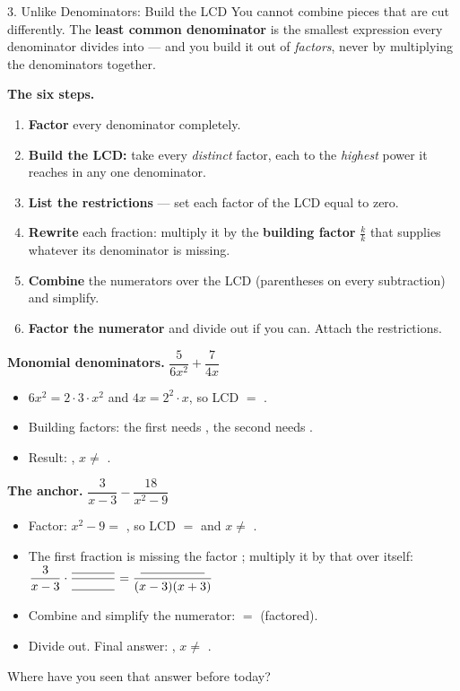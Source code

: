 \documentclass[10pt]{article}
\begin{document}
\begin{notesbox}{3. Unlike Denominators: Build the LCD}
You cannot combine pieces that are cut differently. The \textbf{least common denominator} is the
smallest expression every denominator divides into --- and you build it out of \emph{factors}, never by
multiplying the denominators together.

\vspace{4pt}
\textbf{The six steps.}
\begin{enumerate}[leftmargin=1.9em, itemsep=2pt]
  \item \textbf{Factor} every denominator completely.
  \item \textbf{Build the LCD:} take every \emph{distinct} factor, each to the \emph{highest} power it reaches in any one denominator.
  \item \textbf{List the restrictions} --- set each factor of the LCD equal to zero.
  \item \textbf{Rewrite} each fraction: multiply it by the \textbf{building factor} $\frac{k}{k}$ that supplies whatever its denominator is missing.
  \item \textbf{Combine} the numerators over the LCD (parentheses on every subtraction) and simplify.
  \item \textbf{Factor the numerator} and divide out if you can. Attach the restrictions.
\end{enumerate}

\vspace{4pt}
\textbf{Monomial denominators.} \; $\dfrac{5}{6x^2}+\dfrac{7}{4x}$
\begin{itemize}[leftmargin=1.5em, itemsep=3pt]
  \item $6x^2=2\cdot3\cdot x^2$ and $4x=2^2\cdot x$, so LCD $=$ \blank{1.6cm}.
  \item Building factors: the first needs \blank{1.0cm}, the second needs \blank{1.2cm}.
  \item Result: \blank{2.6cm}, \; $x\neq$ \blank{1.0cm}.
\end{itemize}

\vspace{5pt}
\textbf{The anchor.} \; $\dfrac{3}{x-3}-\dfrac{18}{x^2-9}$
\begin{itemize}[leftmargin=1.5em, itemsep=3pt]
  \item Factor: $x^2-9=$ \blank{2.4cm}, so LCD $=$ \blank{2.8cm} and $x\neq$ \blank{1.8cm}.
  \item The first fraction is missing the factor \blank{1.4cm}; multiply it by that over itself:
        $\dfrac{3}{x-3}\cdot\dfrac{\rule{1.2cm}{0.4pt}}{\rule{1.2cm}{0.4pt}}=
        \dfrac{\rule{1.8cm}{0.4pt}}{(x-3)(x+3)}$
  \item Combine and simplify the numerator: \blank{2.4cm} $=$ \blank{2.4cm} (factored).
  \item Divide out. Final answer: \blank{2.0cm}, \; $x\neq$ \blank{1.8cm}.
\end{itemize}
Where have you seen that answer before today? \writeline


\end{notesbox}
\end{document}
